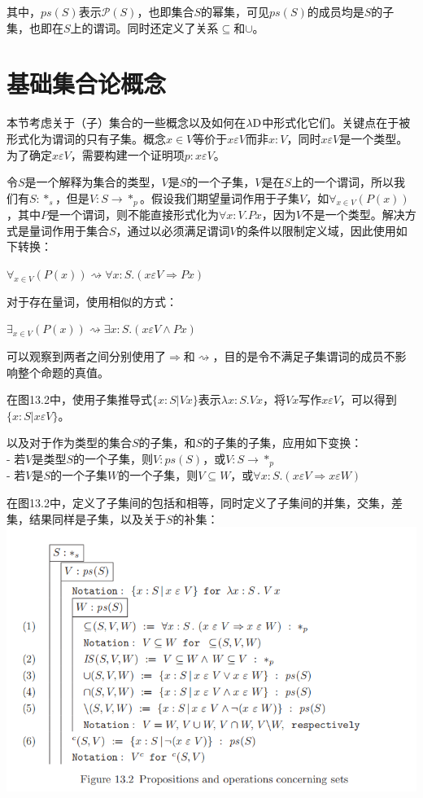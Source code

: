 \documentclass[UTF8]{article}
\begin{document}
		其中，$ps(S)$表示$\mathcal{P}(S)$，也即集合$S$的幂集，可见$ps(S)$的成员均是$S$的子集，也即在$S$上的谓词。同时还定义了关系$\subseteq$和$\cup$。
		
	\section{基础集合论概念}
	\noindent
	本节考虑关于（子）集合的一些概念以及如何在$\lambda{\rm D}$中形式化它们。关键点在于被形式化为谓词的只有子集。概念$x\in V$等价于$x\varepsilon V$而非$x:V$，同时$x\varepsilon V$是一个类型。为了确定$x\varepsilon V$，需要构建一个证明项$p:x\varepsilon V$。
		
		令$S$是一个解释为集合的类型，$V$是$S$的一个子集，$V$是在$S$上的一个谓词，所以我们有$S:*_s$，但是$V:S\rightarrow*_p$。假设我们期望量词作用于子集$V$，如$\forall_{x\in V}(P(x))$，其中$P$是一个谓词，则不能直接形式化为$\forall x:V.Px$，因为$V$不是一个类型。解决方式是量词作用于集合$S$，通过以必须满足谓词$V$的条件以限制定义域，因此使用如下转换：
		
		$\forall_{x\in V}(P(x))\rightsquigarrow \forall x:S.(x\varepsilon V\Rightarrow Px)$
		
		对于存在量词，使用相似的方式：
		
		$\exists_{x\in V}(P(x))\rightsquigarrow \exists x:S.(x\varepsilon V\land Px)$
		
		可以观察到两者之间分别使用了$\Rightarrow$和$\rightsquigarrow$，目的是令不满足子集谓词的成员不影响整个命题的真值。
		
		在图13.2中，使用子集推导式$\{x:S|Vx\}$表示$\lambda x:S.Vx$，将$V x$写作$x\varepsilon V$，可以得到$\{x:S|x\varepsilon V\}$。
		
		以及对于作为类型的集合$S$的子集，和$S$的子集的子集，应用如下变换：\\
		- 若$V$是类型$S$的一个子集，则$V:ps(S)$，或$V:S\rightarrow*_p$\\
		- 若$V$是$S$的一个子集$W$的一个子集，则$V\subseteq W$，或$\forall x:S.(x\varepsilon V\Rightarrow x\varepsilon W)$
		
		在图13.2中，定义了子集间的包括和相等，同时定义了子集间的并集，交集，差集，结果同样是子集，以及关于$S$的补集：\\
		\includegraphics[width=0.93\linewidth]{"../imgs/13-2.png"}
		
\end{document}
